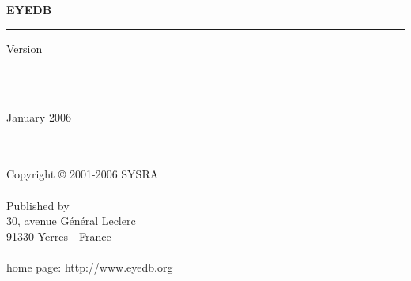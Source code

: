 
\thispagestyle{empty}

\mbox{ }
\\
\vspace{3 cm}
\\
{\bf{\Huge E{\LARGE YE}DB} \hspace{0.cm} {\Huge \mantitle}}
\\
\newcommand{\rulewidth}{17.2cm}
\rule{\rulewidth}{1.6mm}
\begin{flushright}
{\large Version \eyedbversion}
\end{flushright}
\mbox{ }
\\
\vspace{11 cm}
\\
\begin{flushright}
{\large January 2006}
\end{flushright}

\newpage

\thispagestyle{empty}

\mbox{ }
\\
\vspace{1cm}
\\
Copyright {\copyright} 2001-2006 SYSRA
\\
\vspace{1cm}
\\
Published by \sysra
\\
30, avenue G\'en\'eral Leclerc
\\
91330 Yerres - France
\\
\\
home page: http://www.eyedb.org

